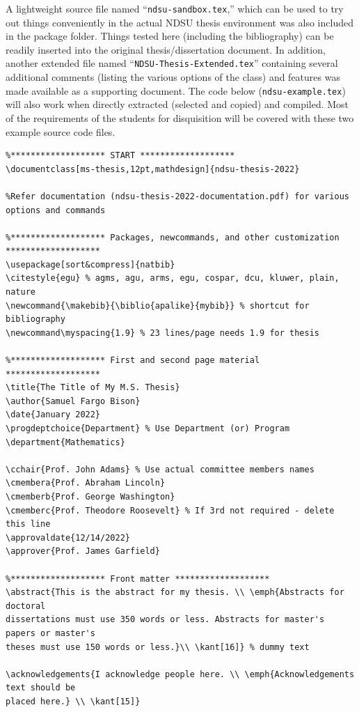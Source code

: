\documentclass{article}
\begin{document}
A lightweight source file named ``\texttt{ndsu-sandbox.tex},'' which can be used to try out things conveniently in the actual NDSU thesis environment was also included in the package folder. Things tested here (including the bibliography) can be readily inserted into the original thesis/dissertation document. In addition, another extended file named ``\texttt{NDSU-Thesis-Extended.tex}'' containing several additional comments (listing the various options of the class) and features was made available as a supporting document. The code below (\texttt{ndsu-example.tex}) will also work when directly extracted (selected and copied) and compiled. Most of the requirements of the students for disquisition will be covered with these two example source code files. 

\begin{verbatim}
%******************* START *******************
\documentclass[ms-thesis,12pt,mathdesign]{ndsu-thesis-2022}

%Refer documentation (ndsu-thesis-2022-documentation.pdf) for various options and commands

%******************* Packages, newcommands, and other customization *******************
\usepackage[sort&compress]{natbib}
\citestyle{egu} % agms, agu, arms, egu, cospar, dcu, kluwer, plain, nature
\newcommand{\makebib}{\biblio{apalike}{mybib}} % shortcut for bibliography
\newcommand\myspacing{1.9} % 23 lines/page needs 1.9 for thesis

%******************* First and second page material *******************
\title{The Title of My M.S. Thesis}
\author{Samuel Fargo Bison}
\date{January 2022}
\progdeptchoice{Department} % Use Department (or) Program
\department{Mathematics}

\cchair{Prof. John Adams} % Use actual committee members names 
\cmembera{Prof. Abraham Lincoln}
\cmemberb{Prof. George Washington}
\cmemberc{Prof. Theodore Roosevelt} % If 3rd not required - delete this line 
\approvaldate{12/14/2022}
\approver{Prof. James Garfield}

%******************* Front matter *******************
\abstract{This is the abstract for my thesis. \\ \emph{Abstracts for doctoral
dissertations must use 350 words or less. Abstracts for master's papers or master's
theses must use 150 words or less.}\\ \kant[16]} % dummy text

\acknowledgements{I acknowledge people here. \\ \emph{Acknowledgements text should be
placed here.} \\ \kant[15]}


\end{verbatim}
\end{document}

